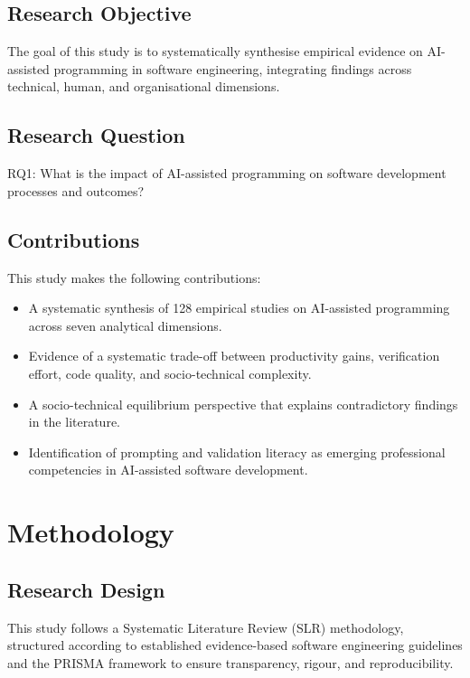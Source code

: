 \documentclass[conference]{IEEEtran}
\begin{document}
\subsection{Research Objective}

The goal of this study is to systematically synthesise empirical evidence on AI-assisted programming in software engineering, integrating findings across technical, human, and organisational dimensions.

\subsection{Research Question}

RQ1: What is the impact of AI-assisted programming on software development processes and outcomes?

\subsection{Contributions}

This study makes the following contributions:

\begin{itemize}
    \item A systematic synthesis of 128 empirical studies on AI-assisted programming across seven analytical dimensions.
    \item Evidence of a systematic trade-off between productivity gains, verification effort, code quality, and socio-technical complexity.
    \item A socio-technical equilibrium perspective that explains contradictory findings in the literature.
    \item Identification of prompting and validation literacy as emerging professional competencies in AI-assisted software development.
\end{itemize}

\section{Methodology}

\subsection{Research Design}

This study follows a Systematic Literature Review (SLR) methodology, structured according to established evidence-based software engineering guidelines \cite{kitchenham2007guidelines} and the PRISMA framework \cite{page2021prisma} to ensure transparency, rigour, and reproducibility.
\end{document}
